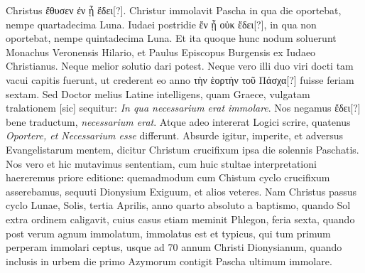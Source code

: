 Christus \textgreek{ἔθυσεν ἐν ᾗ ἔδει[?]}.
Christur immolavit Pascha in qua die
oportebat, nempe quartadecima Luna.
Iudaei postridie \textgreek{ἔν ᾗ οὐκ ἔδει[?]},
in qua non oportebat, nempe quintadecima Luna.
Et ita quoque
hunc nodum soluerunt Monachus Veronensis Hilario, et Paulus
Episcopus Burgensis ex Iudaeo Christianus.
Neque melior solutio
dari potest.
Neque vero illi duo viri docti tam vacui capitis fuerunt,
ut crederent eo anno \textgreek{τὴν ἑορτὴν τοῦ Πάσχα[?]} fuisse feriam sextam.
Sed Doctor melius Latine intelligens, quam Graece,
 vulgatam tralationem [sic]
sequitur: \textit{In qua necessarium erat immolare}.
Nos negamus
\textgreek{ἔδει[?]} bene traductum, \textit{necessarium erat}.
Atque adeo intererat Logici
scrire, quatenus \textit{Oportere, et Necessarium esse} differunt.
Absurde igitur, imperite, et adversus Evangelistarum mentem, dicitur
Christum crucifixum ipsa die solennis Paschatis.
Nos vero et
hic mutavimus sententiam, cum huic stultae interpretationi haereremus
priore editione: quemadmodum cum Chistum cyclo  crucifixum
asserebamus, sequuti Dionysium Exiguum, et alios veteres.
Nam Christus passus cyclo  Lunae,  Solis,
 tertia Aprilis,
anno quarto absoluto a baptismo, quando Sol extra ordinem caligavit,
cuius casus etiam meminit Phlegon, feria sexta, quando
post verum agnum immolatum, immolatus est et typicus, qui tum
primum perperam immolari ceptus, usque ad 70 annum Christi
Dionysianum, quando inclusis in urbem die primo Azymorum
contigit Pascha ultimum immolare.

